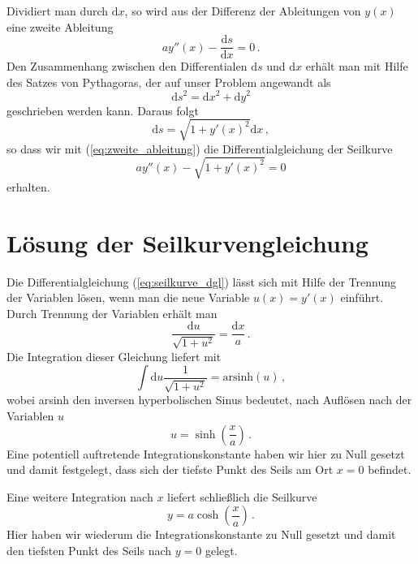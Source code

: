\documentclass[twocolumn,nobalancelastpage]{revtex4}
\begin{document}
Dividiert man durch $\mathrm{d}x$, so wird aus der Differenz der
Ableitungen von $y(x)$ eine zweite Ableitung
\begin{equation}
 ay''(x)-\frac{\mathrm{d}s}{\mathrm{d}x} = 0\,.
 \label{eq:zweite_ableitung}
\end{equation}
Den Zusammenhang zwischen den Differentialen $\mathrm{d}s$ und
$\mathrm{d}x$ erhält man mit Hilfe des Satzes von Pythagoras, der
auf unser Problem angewandt als
\begin{equation}
 \mathrm{d}s^2 = \mathrm{d}x^2+\mathrm{d}y^2
\end{equation}
geschrieben werden kann. Daraus folgt
\begin{equation}
 \mathrm{d}s = \sqrt{1+y'(x)^2}\mathrm{d}x\,,
 \label{eq:ds}
\end{equation}
so dass wir mit (\ref{eq:zweite_ableitung}) die Differentialgleichung
der Seilkurve
\begin{equation}
 ay''(x)-\sqrt{1+y'(x)^2} = 0
 \label{eq:seilkurve_dgl}
\end{equation}
erhalten.

\section{Lösung der Seilkurvengleichung}
Die Differentialgleichung (\ref{eq:seilkurve_dgl}) lässt sich mit Hilfe der
Trennung der Variablen lösen, wenn man die neue Variable $u(x) = y'(x)$
einführt. Durch Trennung der Variablen erhält man
\begin{equation}
 \frac{\mathrm{d}u}{\sqrt{1+u^2}} = \frac{\mathrm{d}x}{a}\,.
\end{equation}
Die Integration dieser Gleichung liefert mit
\begin{equation}
 \int\mathrm{d}u\frac{1}{\sqrt{1+u^2}} = \mathrm{arsinh}(u)\,,
\end{equation}
wobei arsinh den inversen hyperbolischen Sinus bedeutet, nach
Auf\/lösen nach der Variablen $u$ 
\begin{equation}
 u = \sinh\left(\frac{x}{a}\right)\,.
 \label{eq:seilkurve_u}
\end{equation}
Eine potentiell auftretende Integrationskonstante haben wir hier zu Null
gesetzt und damit festgelegt, dass sich der tiefste Punkt des Seils am
Ort $x=0$ befindet.

Eine weitere Integration nach $x$ liefert schließlich die Seilkurve
\begin{equation}
 y= a\cosh\left(\frac{x}{a}\right)\,.
 \label{eq:seilkurve}
\end{equation}
Hier haben wir wiederum die Integrationskonstante zu Null gesetzt und
damit den tiefsten Punkt des Seils nach $y=0$ gelegt.
\end{document}
